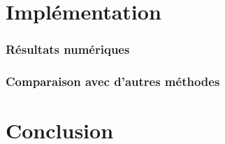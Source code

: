 \documentclass[a4paper]{article} %
\numberwithin{section}{part}
\numberwithin{equation}{section}
\begin{document}
\part{Implémentation}
\section{Résultats numériques}

\section{Comparaison avec d'autres méthodes}

\part{Conclusion}
\end{document}

